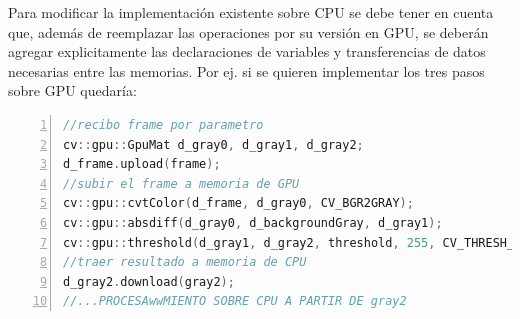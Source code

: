 \documentclass[a4paper,10pt]{report}
\begin{document}
 
Para modificar la implementación existente sobre CPU se debe tener en cuenta que, además de reemplazar las operaciones por su versión en GPU, se deberán agregar explicitamente las declaraciones de variables y transferencias de datos necesarias entre las memorias.
Por ej. si se quieren implementar los tres pasos sobre GPU quedaría:

\begin{lstlisting}[caption={Ejemplo de método process sobre GPU},frame=bt,columns=fullflexible,numbers=left,backgroundcolor=\color{LemonChiffon1},basicstyle=\small,keywordstyle=\ttfamily\small,language=C++,stringstyle=\ttfamily,breaklines=true,xleftmargin=0.5em,xrightmargin=0pt,aboveskip=\bigskipamount,belowskip=\bigskipamount]
//recibo frame por parametro
cv::gpu::GpuMat d_gray0, d_gray1, d_gray2;
d_frame.upload(frame);
//subir el frame a memoria de GPU
cv::gpu::cvtColor(d_frame, d_gray0, CV_BGR2GRAY);
cv::gpu::absdiff(d_gray0, d_backgroundGray, d_gray1); 
cv::gpu::threshold(d_gray1, d_gray2, threshold, 255, CV_THRESH_BINARY);
//traer resultado a memoria de CPU
d_gray2.download(gray2);
//...PROCESAwwMIENTO SOBRE CPU A PARTIR DE gray2
\end{lstlisting}




%  
%  


 
 
 
 
\end{document}
